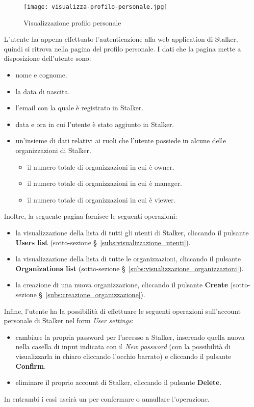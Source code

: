 \documentclass[../manuale-utente.tex]{subfiles}
\begin{document}
\begin{figure}[H]
    \centering
    \texttt{[image: visualizza-profilo-personale.jpg]}
    \caption{Visualizzazione profilo personale}%
    \label{fig:web_app_visualizzazione_profilo_personale}
\end{figure}
L'utente ha appena effettuato l'autenticazione alla web application di Stalker, quindi si ritrova nella pagina del profilo personale.
I dati che la pagina mette a disposizione dell'utente sono:
\begin{itemize}
    \item nome e cognome.
    \item la data di nascita.
    \item l'email con la quale è registrato in Stalker.
    \item data e ora in cui l'utente è stato aggiunto in Stalker.
    \item un'insieme di dati relativi ai ruoli che l'utente possiede in alcune delle organizzazioni di Stalker.
    \begin{itemize}
        \item il numero totale di organizzazioni in cui è owner.
        \item il numero totale di organizzazioni in cui è manager.
        \item il numero totale di organizzazioni in cui è viewer.
    \end{itemize}
\end{itemize}
Inoltre, la seguente pagina fornisce le seguenti operazioni:
\begin{itemize}
    \item la visualizzazione della lista di tutti gli utenti di Stalker, cliccando il pulsante \textbf{Users list} (sotto-sezione §~\ref{subs:visualizzazione_utenti}).
    \item la visualizzazione della lista di tutte le organizzazioni, cliccando il pulsante \textbf{Organizations list} (sotto-sezione §~\ref{subs:visualizzazione_organizzazioni}).
    \item la creazione di una nuova organizzazione, cliccando il pulsante \textbf{Create} (sotto-sezione §~\ref{subs:creazione_organizzazione}).
\end{itemize}
Infine, l'utente ha la possibilità di effettuare le seguenti operazioni sull'account personale di Stalker nel form \textit{User settings}:
\begin{itemize}
  \item cambiare la propria password per l'accesso a Stalker, inserendo quella nuova nella casella di input indicata con il  \textit{New password} (con la possibilità di visualizzarla in chiaro cliccando l'occhio barrato) e cliccando il pulsante \textbf{Confirm}.
  \item eliminare il proprio account di Stalker, cliccando il pulsante \textbf{Delete}.
\end{itemize}
In entrambi i casi uscirà un  per confermare o annullare l'operazione.
\end{document}

